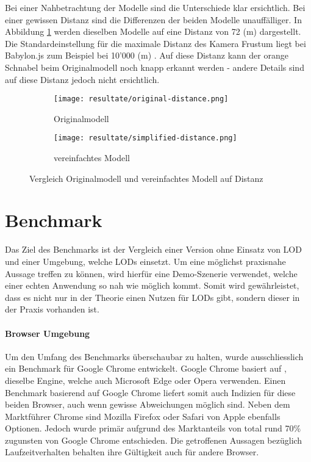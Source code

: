 Bei einer Nahbetrachtung der Modelle sind die Unterschiede klar ersichtlich. Bei einer gewissen Distanz sind die Differenzen der beiden Modelle unauffälliger. In Abbildung \ref{fig:lodComparisonDistance} werden dieselben Modelle auf eine Distanz von 72 (m) dargestellt. Die Standardeinstellung für die maximale Distanz des Kamera Frustum liegt bei Babylon.js zum Beispiel bei 10'000 (m) \cite{babylonMaxZ}. Auf diese Distanz kann der orange Schnabel beim Originalmodell noch knapp erkannt werden - andere Details sind auf diese Distanz jedoch nicht ersichtlich.

\begin{figure}[H]
  \centering
  \begin{subfigure}{.4\textwidth}
    \centering
    \texttt{[image: resultate/original-distance.png]}
    \caption{Originalmodell}
  \end{subfigure}
  \begin{subfigure}{.4\textwidth}
    \centering
    \texttt{[image: resultate/simplified-distance.png]}
    \caption{vereinfachtes Modell}
  \end{subfigure}
  \caption{Vergleich Originalmodell und vereinfachtes Modell auf Distanz}
  \label{fig:lodComparisonDistance}
\end{figure}

\section{Benchmark}

Das Ziel des Benchmarks ist der Vergleich einer Version ohne Einsatz von LOD und einer Umgebung, welche LODs einsetzt. Um eine möglichst praxisnahe Aussage treffen zu können, wird hierfür eine Demo-Szenerie verwendet, welche einer echten Anwendung so nah wie möglich kommt. Somit wird gewährleistet, dass es nicht nur in der Theorie einen Nutzen für LODs gibt, sondern dieser in der Praxis vorhanden ist.

\paragraph{Browser Umgebung}
Um den Umfang des Benchmarks überschaubar zu halten, wurde ausschliesslich ein Benchmark für Google Chrome entwickelt.
Google Chrome basiert auf , dieselbe Engine, welche auch Microsoft Edge oder Opera verwenden.
Einen Benchmark basierend auf Google Chrome liefert somit auch Indizien für diese beiden Browser, auch wenn gewisse Abweichungen möglich sind.
Neben dem Marktführer Chrome sind Mozilla Firefox oder Safari von Apple ebenfalls Optionen. Jedoch wurde primär aufgrund des Marktanteils von total rund 70\% \cite{browserUsage} zugunsten von Google Chrome entschieden.
Die getroffenen Aussagen bezüglich Laufzeitverhalten behalten ihre Gültigkeit auch für andere Browser.


